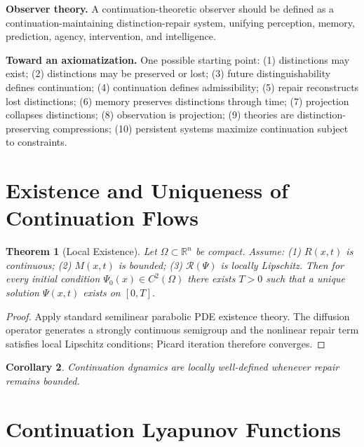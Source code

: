 \documentclass[12pt,a4paper]{article}
\newtheorem{theorem}{Theorem}[section]
\newtheorem{corollary}[theorem]{Corollary}
\begin{document}
\medskip\noindent\textbf{Observer theory.} A continuation-theoretic observer should be defined as a continuation-maintaining distinction-repair system, unifying perception, memory, prediction, agency, intervention, and intelligence.

\medskip\noindent\textbf{Toward an axiomatization.} One possible starting point: (1) distinctions may exist; (2) distinctions may be preserved or lost; (3) future distinguishability defines continuation; (4) continuation defines admissibility; (5) repair reconstructs lost distinctions; (6) memory preserves distinctions through time; (7) projection collapses distinctions; (8) observation is projection; (9) theories are distinction-preserving compressions; (10) persistent systems maximize continuation subject to constraints.

\newpage

\appendix

\section{Existence and Uniqueness of Continuation Flows}

\begin{theorem}[Local Existence]
Let $\Omega \subset \mathbb{R}^n$ be compact. Assume: (1) $R(x,t)$ is continuous; (2) $M(x,t)$ is bounded; (3) $\mathcal{R}(\Psi)$ is locally Lipschitz. Then for every initial condition $\Psi_0(x) \in C^2(\Omega)$ there exists $T > 0$ such that a unique solution $\Psi(x,t)$ exists on $[0,T]$.
\end{theorem}

\begin{proof}
Apply standard semilinear parabolic PDE existence theory. The diffusion operator generates a strongly continuous semigroup and the nonlinear repair term satisfies local Lipschitz conditions; Picard iteration therefore converges.
\end{proof}

\begin{corollary}
Continuation dynamics are locally well-defined whenever repair remains bounded.
\end{corollary}

\section{Continuation Lyapunov Functions}
\end{document}
